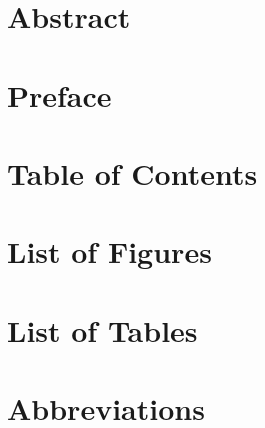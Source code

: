 \documentclass[11pt,final]{tutdrthesis}
\begin{document}

\frontmatter
\setcounter{secnumdepth}{-1}

\chapter{Abstract}

\chapter{Preface}

\chapter{Table of Contents}
\tableofcontents
\chapter{List of Figures}
\listoffigures
\chapter{List of Tables}
\listoftables

\chapter{Abbreviations}
\end{document}
